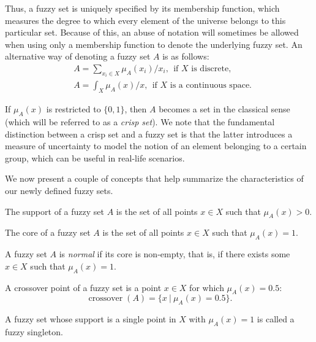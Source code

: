 Thus, a fuzzy set is uniquely specified by its membership function, which measures the degree to which every element of the universe belongs to this particular set. Because of this, an abuse of notation will sometimes be allowed when using only a membership function to denote the underlying fuzzy set. An alternative way of denoting a fuzzy set $A$ is as follows:
\begin{align*}
& A = \sum_{x_i \in X} \mu_A(x_i) \slash x_i, \ \ \text{if $X$ is discrete,} \\
& A = \int_X \mu_A(x) \slash x, \ \ \text{if $X$ is a continuous space.}
\end{align*}

\begin{remark}
	If $\mu_A(x)$ is restricted to $\{0,1\}$, then $A$ becomes a set in the classical sense (which will be referred to as a \textit{crisp set}). We note that the fundamental distinction between a crisp set and a fuzzy set is that the latter introduces a measure of uncertainty to model the notion of an element belonging to a certain group, which can be useful in real-life scenarios.
\end{remark}

We now present a couple of concepts that help summarize the characteristics of our newly defined fuzzy sets.

\begin{definition}[Support] The support of a fuzzy set $A$ is the set of all points $x \in X$ such that $\mu_A(x) > 0$.
\end{definition}

\begin{definition}[Core] The core of a fuzzy set $A$ is the set of all points $x \in X$ such that $\mu_A(x) = 1$.
\end{definition}

\begin{definition}[Normality] A fuzzy set $A$ is \textit{normal} if its core is non-empty, that is, if there exists some $x \in X$ such that $\mu_A(x) = 1$.
\end{definition}

\begin{definition} A crossover point of a fuzzy set is a point $x \in X$ for which $\mu_A(x) = 0.5$:
\[
\operatorname{crossover}(A) = \{ x \ | \ \mu_A(x) = 0.5 \}.
\]

\end{definition}

\begin{definition} A fuzzy set whose support is a single point in $X$ with $\mu_A(x) = 1$ is called a fuzzy singleton.

\end{definition}

